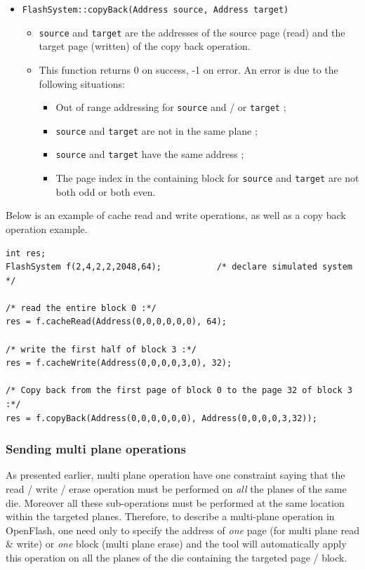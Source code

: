 \begin{itemize}
  \item \verb+FlashSystem::copyBack(Address source, Address target)+
  \begin{itemize}
    \item \verb+source+ and \verb+target+ are the addresses of the source page (read) and the target page (written) of the copy back operation.
    \item This function returns 0 on success, -1 on error. An error is due to the following situations:
    \begin{itemize}
      \item Out of range addressing for \verb+source+ and / or \verb+target+ ;
      \item \verb+source+ and \verb+target+ are not in the same plane ;
      \item \verb+source+ and \verb+target+ have the same address ;
      \item The page index in the containing block for \verb+source+ and \verb+target+ are not both odd or both even.
    \end{itemize}
  \end{itemize}
\end{itemize}

Below is an example of cache read and write operations, as well as a copy back operation example.

\begin{lstlisting}
int res;
FlashSystem f(2,4,2,2,2048,64);           /* declare simulated system */

/* read the entire block 0 :*/
res = f.cacheRead(Address(0,0,0,0,0,0), 64);

/* write the first half of block 3 :*/
res = f.cacheWrite(Address(0,0,0,0,3,0), 32);

/* Copy back from the first page of block 0 to the page 32 of block 3 :*/
res = f.copyBack(Address(0,0,0,0,0,0), Address(0,0,0,0,3,32));
\end{lstlisting}

\subsubsection{Sending multi plane operations}
As presented earlier, multi plane operation have one constraint saying that the read / write / erase operation must be performed on \emph{all} the planes of the same die. Moreover all these sub-operations must be performed at the same location within the targeted planes. Therefore, to describe a multi-plane operation in OpenFlash, one need only to specify the address of \emph{one} page (for multi plane read \& write) or \emph{one} block (multi plane erase) and the tool will automatically apply this operation on all the planes of the die containing the targeted page / block.

